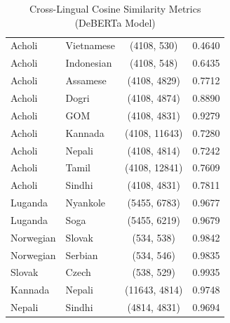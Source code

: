 \documentclass[11pt]{article}
\begin{document}
\begin{table}
\begin{tabular}{llcc}
            Acholi                       & Vietnamese          & (4108, 530)           & 0.4640                    \\
            Acholi                       & Indonesian          & (4108, 548)           & 0.6435                    \\
            Acholi                       & Assamese            & (4108, 4829)          & 0.7712                    \\
            Acholi                       & Dogri               & (4108, 4874)          & 0.8890                    \\
            Acholi                       & GOM                 & (4108, 4831)          & 0.9279                    \\
            Acholi                       & Kannada             & (4108, 11643)         & 0.7280                    \\
            Acholi                       & Nepali              & (4108, 4814)          & 0.7242                    \\
            Acholi                       & Tamil               & (4108, 12841)         & 0.7609                    \\
            Acholi                       & Sindhi              & (4108, 4831)          & 0.7811                    \\
            Luganda                      & Nyankole            & (5455, 6783)          & 0.9677                    \\
            Luganda                      & Soga                & (5455, 6219)          & 0.9679                    \\
            Norwegian                    & Slovak              & (534, 538)            & 0.9842                    \\
            Norwegian                    & Serbian             & (534, 546)            & 0.9835                    \\
            Slovak                       & Czech               & (538, 529)            & 0.9935                    \\
            Kannada                      & Nepali              & (11643, 4814)         & 0.9748                    \\
            Nepali                       & Sindhi              & (4814, 4831)          & 0.9694                    \\
            \bottomrule
        \end{tabular}
        \caption{Cross-Lingual Cosine Similarity Metrics (DeBERTa Model)}
        \label{tab:deberta_sim}
    \end{table}
\end{document}
